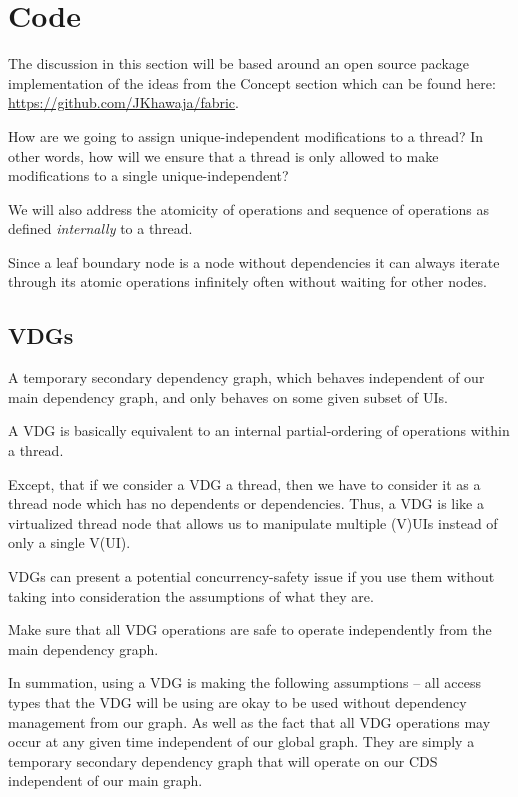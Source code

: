 \section{Code}

The discussion in this section will be based around an open source package implementation of the ideas from the Concept section which can be found here: \url{https://github.com/JKhawaja/fabric}.

How are we going to assign unique-independent modifications to a thread? In other words, how will we ensure that a thread is only allowed to make modifications to a single unique-independent?

We will also address the atomicity of operations and sequence of operations as defined \textit{internally} to a thread.

Since a leaf boundary node is a node without dependencies it can always iterate through its atomic operations infinitely often without waiting for other nodes.

\subsection{VDGs}

\begin{con-def}
	\label{vdg-code}
 A temporary secondary dependency graph, which behaves independent of our main dependency graph, and only behaves on some given subset of UIs.
\end{con-def}

A VDG is basically equivalent to an internal partial-ordering of operations within a thread.

Except, that if we consider a VDG a thread, then we have to consider it as a thread node which has no dependents or dependencies. Thus, a VDG is like a virtualized thread node that allows us to manipulate multiple (V)UIs instead of only a single V(UI).

VDGs can present a potential concurrency-safety issue if you use them without taking into consideration the assumptions of what they are.

Make sure that all VDG operations are safe to operate independently from the main dependency graph.

In summation, using a VDG is making the following assumptions -- all access types that the VDG will be using are okay to be used without dependency management from our graph. As well as the fact that all VDG operations may occur at any given time independent of our global graph. They are simply a temporary secondary dependency graph that will operate on our CDS independent of our main graph.


